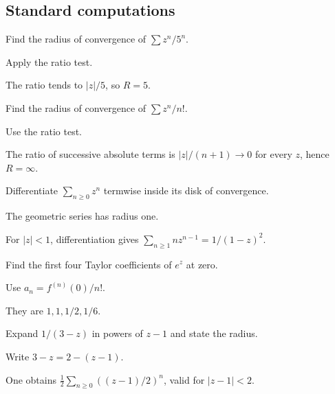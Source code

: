 \subsection*{Standard computations}

\begin{exercise}\label{exr:iv03-expand-01}
Find the radius of convergence of \(\sum z^n/5^n\).
\end{exercise}
\begin{hint}
Apply the ratio test.
\end{hint}
\begin{solution}
The ratio tends to \(|z|/5\), so \(R=5\).
\end{solution}

\begin{exercise}\label{exr:iv03-expand-02}
Find the radius of convergence of \(\sum z^n/n!\).
\end{exercise}
\begin{hint}
Use the ratio test.
\end{hint}
\begin{solution}
The ratio of successive absolute terms is \(|z|/(n+1)\to0\) for every \(z\), hence \(R=\infty\).
\end{solution}

\begin{exercise}\label{exr:iv03-expand-03}
Differentiate \(\sum_{n\ge0}z^n\) termwise inside its disk of convergence.
\end{exercise}
\begin{hint}
The geometric series has radius one.
\end{hint}
\begin{solution}
For \(|z|<1\), differentiation gives \(\sum_{n\ge1}nz^{n-1}=1/(1-z)^2\).
\end{solution}

\begin{exercise}\label{exr:iv03-expand-04}
Find the first four Taylor coefficients of \(e^z\) at zero.
\end{exercise}
\begin{hint}
Use \(a_n=f^{(n)}(0)/n!\).
\end{hint}
\begin{solution}
They are \(1,1,1/2,1/6\).
\end{solution}

\begin{exercise}\label{exr:iv03-expand-05}
Expand \(1/(3-z)\) in powers of \(z-1\) and state the radius.
\end{exercise}
\begin{hint}
Write \(3-z=2-(z-1)\).
\end{hint}
\begin{solution}
One obtains \(\frac12\sum_{n\ge0}((z-1)/2)^n\), valid for \(|z-1|<2\).
\end{solution}

